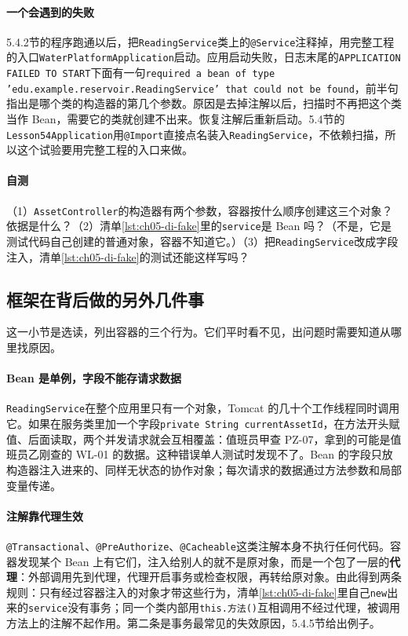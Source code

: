 \paragraph{一个会遇到的失败}5.4.2节的程序跑通以后，把\texttt{ReadingService}类上的\texttt{@Service}注释掉，用完整工程的入口\texttt{WaterPlatformApplication}启动。应用启动失败，日志末尾的\texttt{APPLICATION FAILED TO START}下面有一句\texttt{required a bean of type 'edu.example.reservoir.ReadingService' that could not be found}，前半句指出是哪个类的构造器的第几个参数。原因是去掉注解以后，扫描时不再把这个类当作 Bean，需要它的类就创建不出来。恢复注解后重新启动。5.4节的\texttt{Lesson54Application}用\texttt{@Import}直接点名装入\texttt{ReadingService}，不依赖扫描，所以这个试验要用完整工程的入口来做。

\paragraph{自测}（1）\texttt{AssetController}的构造器有两个参数，容器按什么顺序创建这三个对象？依据是什么？（2）清单\ref{lst:ch05-di-fake}里的\texttt{service}是 Bean 吗？（不是，它是测试代码自己创建的普通对象，容器不知道它。）（3）把\texttt{ReadingService}改成字段注入，清单\ref{lst:ch05-di-fake}的测试还能这样写吗？

\subsection{框架在背后做的另外几件事}

这一小节是选读，列出容器的三个行为。它们平时看不见，出问题时需要知道从哪里找原因。

\paragraph{Bean 是单例，字段不能存请求数据}\texttt{ReadingService}在整个应用里只有一个对象，Tomcat 的几十个工作线程同时调用它。如果在服务类里加一个字段\texttt{private String currentAssetId}，在方法开头赋值、后面读取，两个并发请求就会互相覆盖：值班员甲查 PZ-07，拿到的可能是值班员乙刚查的 WL-01 的数据。这种错误单人测试时发现不了。Bean 的字段只放构造器注入进来的、同样无状态的协作对象；每次请求的数据通过方法参数和局部变量传递。

\paragraph{注解靠代理生效}\texttt{@Transactional}、\texttt{@PreAuthorize}、\texttt{@Cacheable}这类注解本身不执行任何代码。容器发现某个 Bean 上有它们，注入给别人的就不是原对象，而是一个包了一层的\textbf{代理}：外部调用先到代理，代理开启事务或检查权限，再转给原对象。由此得到两条规则：只有经过容器注入的对象才带这些行为，清单\ref{lst:ch05-di-fake}里自己\texttt{new}出来的\texttt{service}没有事务；同一个类内部用\texttt{this.方法()}互相调用不经过代理，被调用方法上的注解不起作用。第二条是事务最常见的失效原因，5.4.5节给出例子。

